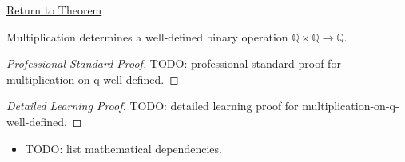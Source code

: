 \newpage
{}
\label{prf:multiplication-on-q-well-defined}

\begin{remark*}[Return]
\hyperref[thm:multiplication-on-q-well-defined]{Return to Theorem}
\end{remark*}

\begin{theorem*}
Multiplication determines a well-defined binary operation
$\mathbb{Q}\times\mathbb{Q}\to\mathbb{Q}$.
\end{theorem*}

\begin{proof}[Professional Standard Proof]
\LRAProofBodyStart
TODO: professional standard proof for multiplication-on-q-well-defined.
\end{proof}

\begin{proof}[Detailed Learning Proof]
\LRAProofBodyStart
TODO: detailed learning proof for multiplication-on-q-well-defined.
\end{proof}

\begin{remark*}
\end{remark*}

\begin{dependencies}
\begin{itemize}
  \item TODO: list mathematical dependencies.
\end{itemize}
\end{dependencies}

\clearpage
